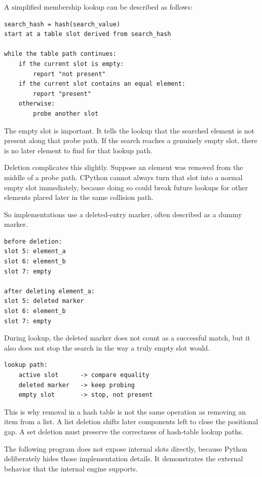 A simplified membership lookup can be described as follows:

\begin{verbatim}
search_hash = hash(search_value)
start at a table slot derived from search_hash

while the table path continues:
    if the current slot is empty:
        report "not present"
    if the current slot contains an equal element:
        report "present"
    otherwise:
        probe another slot
\end{verbatim}

The empty slot is important. It tells the lookup that the searched element is not present along that probe path. If the search reaches a genuinely empty slot, there is no later element to find for that lookup path.

Deletion complicates this slightly. Suppose an element was removed from the middle of a probe path. CPython cannot always turn that slot into a normal empty slot immediately, because doing so could break future lookups for other elements placed later in the same collision path.

So implementations use a deleted-entry marker, often described as a dummy marker.

\begin{verbatim}
before deletion:
slot 5: element_a
slot 6: element_b
slot 7: empty

after deleting element_a:
slot 5: deleted marker
slot 6: element_b
slot 7: empty
\end{verbatim}

During lookup, the deleted marker does not count as a successful match, but it also does not stop the search in the way a truly empty slot would.

\begin{verbatim}
lookup path:
    active slot      -> compare equality
    deleted marker   -> keep probing
    empty slot       -> stop, not present
\end{verbatim}

This is why removal in a hash table is not the same operation as removing an item from a list. A list deletion shifts later components left to close the positional gap. A set deletion must preserve the correctness of hash-table lookup paths.

The following program does not expose internal slots directly, because Python deliberately hides those implementation details. It demonstrates the external behavior that the internal engine supports.

